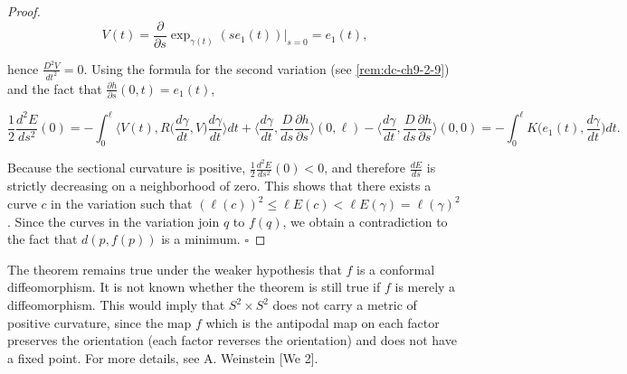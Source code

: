 \begin{proof}
  $$
  V(t)=\frac{\partial}{\partial s}\exp_{\gamma(t)}(se_1(t))\Big|_{s=0}=e_1(t),
  $$
  
  hence $\frac{D^2 V}{dt^2}=0$. Using the formula for the second variation (see
  \cref{rem:dc-ch9-2-9}) and the fact that $\frac{\partial h}{\partial s}(0,t)=e_1(t)$,
  
  $$
  \frac{1}{2}\frac{d^2 E}{ds^2}(0)=-\int_0^\ell\Big\langle V(t),R\Big(\frac{d\gamma}{dt},V\Big)\frac{d\gamma}{dt}\Big\rangle dt+\Big\langle\frac{d\gamma}{dt},\frac{D}{ds}\frac{\partial h}{\partial s}\Big\rangle(0,\ell)-\Big\langle\frac{d\gamma}{dt},\frac{D}{ds}\frac{\partial h}{\partial s}\Big\rangle(0,0)=-\int_0^\ell K\Big(e_1(t),\frac{d\gamma}{dt}\Big)dt.
  $$
  
  Because the sectional curvature is positive, $\frac{1}{2}\frac{d^2 E}{ds^2}(0)<0$,
  and therefore $\frac{dE}{ds}$ is strictly decreasing on a neighborhood of zero.
  This shows that there exists a curve $c$ in the variation such that
  $(\ell(c))^2\le\ell E(c)<\ell E(\gamma)=\ell(\gamma)^2$. Since the curves in the
  variation join $q$ to $f(q)$, we obtain a contradiction to the fact that
  $d(p,f(p))$ is a minimum. $\square$
\end{proof}

\begin{remark}[Remark 3.9]
  \label{rem:dc-ch9-3-9}
  The theorem remains true under the weaker hypothesis that $f$ is a conformal
  diffeomorphism. It is not known whether the theorem is still true if $f$ is merely
  a diffeomorphism. This would imply that $S^2\times S^2$ does not carry a metric of
  positive curvature, since the map $f$ which is the antipodal map on each factor
  preserves the orientation (each factor reverses the orientation) and does not have
  a fixed point. For more details, see A. Weinstein [We 2].
\end{remark}

